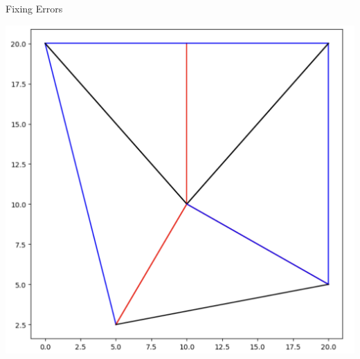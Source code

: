 \begin{frame}{Fixing Errors}
\begin{center}
          \includegraphics[scale=.18]{images/curr3.png}
        
    \end{center}

    
    

  
    

\end{frame}

